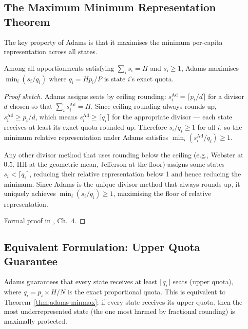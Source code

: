 \label{sec:bias}

\subsection{The Maximum Minimum Representation Theorem}

The key property of Adams is that it maximises the minimum per-capita
representation across all states.

\begin{theorem}
  \label{thm:adams-minmax}
  Among all apportionments satisfying $\sum_i s_i = H$ and $s_i \geq 1$,
  Adams maximises $\min_i (s_i/q_i)$ where $q_i = Hp_i/P$ is state $i$'s
  exact quota.
\end{theorem}

\begin{proof}[Proof sketch]
  Adams assigns seats by ceiling rounding: $s_i^{\text{Ad}} = \lceil p_i/d \rceil$
  for a divisor $d$ chosen so that $\sum_i s_i^{\text{Ad}} = H$.
  Since ceiling rounding always rounds up, $s_i^{\text{Ad}} \geq p_i/d$,
  which means $s_i^{\text{Ad}} \geq \lceil q_i \rceil$ for the appropriate
  divisor --- each state receives at least its exact quota rounded up.
  Therefore $s_i/q_i \geq 1$ for all $i$, so the minimum relative
  representation under Adams satisfies $\min_i (s_i^{\text{Ad}}/q_i) \geq 1$.

  Any other divisor method that uses rounding below the ceiling (e.g.,
  Webster at 0.5, HH at the geometric mean, Jefferson at the floor)
  assigns some states $s_i < \lceil q_i \rceil$, reducing their relative
  representation below 1 and hence reducing the minimum.
  Since Adams is the unique divisor method that always rounds up,
  it uniquely achieves $\min_i (s_i/q_i) \geq 1$, maximising the
  floor of relative representation.

  Formal proof in \citet{balinski1982fair}, Ch.~4.
\end{proof}

\subsection{Equivalent Formulation: Upper Quota Guarantee}

Adams guarantees that every state receives at least $\lceil q_i \rceil$
seats (upper quota), where $q_i = p_i \times H / N$ is the exact
proportional quota.
This is equivalent to Theorem~\ref{thm:adams-minmax}:
if every state receives its upper quota, then the most underrepresented
state (the one most harmed by fractional rounding) is maximally protected.

